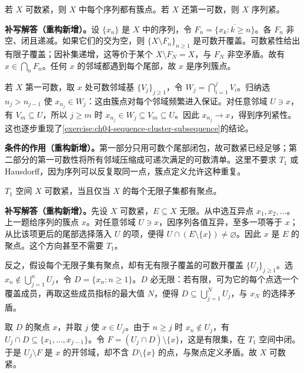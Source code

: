\documentclass[../../main.tex]{subfiles}%
\begin{document}
\begin{exercise}\label{exercise:ch04-countably-compact-cluster}
若 $X$ 可数紧，则 $X$ 中每个序列都有簇点。若 $X$ 还第一可数，则 $X$ 序列紧。
\end{exercise}
\begin{solution}
\textbf{补写解答（重构新增）。}设 $\{x_n\}$ 是 $X$ 中的序列，令 $F_n=\overline{\{x_k:k\ge n\}}$。各 $F_n$ 非空、闭且递减。如果它们的交为空，则 $\{X\setminus F_n\}_{n\ge1}$ 是可数开覆盖。可数紧性给出有限子覆盖；因补集递增，这等价于某个 $X\setminus F_N=X$，与 $F_N$ 非空矛盾。故有 $x\in\bigcap_nF_n$。任何 $x$ 的邻域都遇到每个尾部，故 $x$ 是序列簇点。

若 $X$ 第一可数，取 $x$ 处可数邻域基 $\{V_j\}_{j\ge1}$，令 $W_j=\bigcap_{i=1}^jV_i$。归纳选 $n_j>n_{j-1}$ 使 $x_{n_j}\in W_j$：这由簇点对每个邻域频繁进入保证。对任意邻域 $U\ni x$，有 $V_m\subseteq U$，所以 $j\ge m$ 时 $x_{n_j}\in W_j\subseteq V_m\subseteq U$。因此 $x_{n_j}\to x$，得到序列紧性。这也逐步重现了\cref{exercise:ch04-sequence-cluster-subsequence}的结论。
\end{solution}
\begin{remark}
\textbf{条件的作用（重构新增）。}第一部分只用可数个尾部闭包，故可数紧已经足够；第二部分的第一可数性将所有邻域压缩成可递次满足的可数清单。这里不要求 $T_1$ 或 Hausdorff，因为序列可以反复取同一点，簇点定义允许这种重复。
\end{remark}
\begin{exercise}\label{exercise:ch04-countably-compact-accumulation}
$T_1$ 空间 $X$ 可数紧，当且仅当 $X$ 的每个无限子集都有聚点。
\end{exercise}
\begin{solution}
\textbf{补写解答（重构新增）。}先设 $X$ 可数紧，$E\subseteq X$ 无限。从中选互异点 $x_1,x_2,\ldots$。上一题给序列的簇点 $x$。对任意邻域 $U\ni x$，因序列各值互异，至多一项等于 $x$；从比该项更后的尾部选择落入 $U$ 的项，便得 $U\cap(E\setminus\{x\})\ne\varnothing$。因此 $x$ 是 $E$ 的聚点。这个方向甚至不需要 $T_1$。

反之，假设每个无限子集有聚点，却有无有限子覆盖的可数开覆盖 $\{U_j\}_{j\ge1}$。选 $x_n\notin\bigcup_{j=1}^nU_j$，令 $D=\{x_n:n\ge1\}$。$D$ 必无限：若有限，可为它的每个点选一个覆盖成员，再取这些成员指标的最大值 $N$，便得 $D\subseteq\bigcup_{j=1}^NU_j$，与 $x_N$ 的选择矛盾。

取 $D$ 的聚点 $x$，并取 $j$ 使 $x\in U_j$。由于 $n\ge j$ 时 $x_n\notin U_j$，有 $U_j\cap D\subseteq\{x_1,\ldots,x_{j-1}\}$。令 $F=(U_j\cap D)\setminus\{x\}$，这是有限集，在 $T_1$ 空间中闭。于是 $U_j\setminus F$ 是 $x$ 的开邻域，却不含 $D\setminus\{x\}$ 的点，与聚点定义矛盾。故 $X$ 可数紧。
\end{solution}
\end{document}
